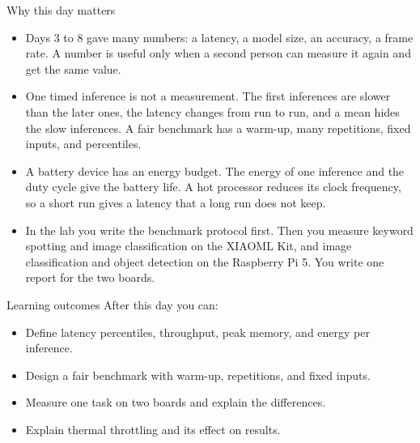 \begin{frame}{Why this day matters}
  \begin{itemize}
    \item Days 3 to 8 gave many numbers: a latency, a model size, an accuracy,
          a frame rate. A number is useful only when a second person can
          measure it again and get the same value.
    \item One timed inference is not a measurement. The first inferences are
          slower than the later ones, the latency changes from run to run, and
          a mean hides the slow inferences. A fair benchmark has a warm-up,
          many repetitions, fixed inputs, and percentiles.
    \item A battery device has an energy budget. The energy of one inference
          and the duty cycle give the battery life. A hot processor reduces
          its clock frequency, so a short run gives a latency that a long run
          does not keep.
    \item In the lab you write the benchmark protocol first. Then you measure
          keyword spotting and image classification on the XIAOML Kit, and
          image classification and object detection on the Raspberry Pi 5. You
          write one report for the two boards.
  \end{itemize}
\end{frame}

\begin{frame}{Learning outcomes}
  After this day you can:
  \begin{itemize}
    \item Define latency percentiles, throughput, peak memory, and energy per
          inference.
    \item Design a fair benchmark with warm-up, repetitions, and fixed inputs.
    \item Measure one task on two boards and explain the differences.
    \item Explain thermal throttling and its effect on results.
  \end{itemize}
\end{frame}
